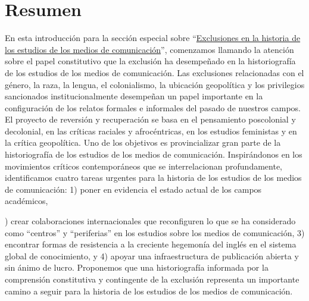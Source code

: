 \documentclass{tufte-handout}
\begin{document}
\begin{titlepage}
\begin{fullwidth}
\end{fullwidth}





\hypertarget{resumen}{%
\section{Resumen}\label{resumen}}

En esta introducción para la sección especial sobre
``\href{https://hms.mediastudies.press/exclusions}{Exclusiones en la
historia de los estudios de los medios de comunicación}'', comenzamos
llamando la atención sobre el papel constitutivo que la exclusión ha
desempeñado en la historiografía de los estudios de los medios de
comunicación. Las exclusiones relacionadas con el género, la raza, la
lengua, el colonialismo, la ubicación geopolítica y los privilegios
sancionados institucionalmente desempeñan un papel importante en la
configuración de los relatos formales e informales del pasado de
nuestros campos. El proyecto de reversión y recuperación se basa en el
pensamiento poscolonial y decolonial, en las críticas raciales y
afrocéntricas, en los estudios feministas y en la crítica geopolítica.
Uno de los objetivos es provincializar gran parte de la historiografía
de los estudios de los medios de comunicación. Inspirándonos en los
movimientos críticos contemporáneos que se interrelacionan
profundamente, identificamos cuatro tareas urgentes para la historia de
los estudios de los medios de comunicación: 1) poner en evidencia el
estado actual de los campos académicos, 

\enlargethispage{2\baselineskip}

\vspace*{2em}





 \end{titlepage}



) crear colaboraciones
internacionales que reconfiguren lo que se ha considerado como
``centros'' y ``periferias'' en los estudios sobre los medios de
comunicación, 3) encontrar formas de resistencia a la creciente
hegemonía del inglés en el sistema global de conocimiento, y 4) apoyar
una infraestructura de publicación abierta y sin ánimo de lucro.
Proponemos que una historiografía informada por la comprensión
constitutiva y contingente de la exclusión representa un importante
camino a seguir para la historia de los estudios de los medios de
comunicación.
\end{document}
